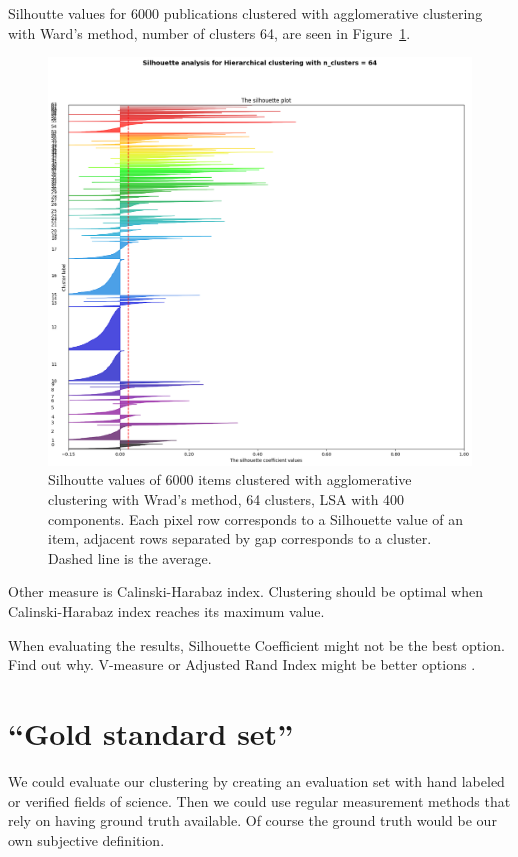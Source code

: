 Silhoutte values for 6000 publications clustered with 
agglomerative clustering with Ward's method, number of clusters 
64, are seen in Figure~\ref{fig:silh01}.
\begin{figure}[ht]
  \begin{center}    
\includegraphics[width=13cm]{images/6000-64-400-Hierarchical-silhouette-plot.png}
    \caption{Silhoutte values of 6000 items clustered with 
    agglomerative clustering with Wrad's method, 64 clusters, 
    LSA with 400 components. Each pixel row corresponds to a 
    Silhouette value of an item, adjacent rows separated by gap 
    corresponds to a cluster.
    Dashed line is the average.}
    \label{fig:silh01}
  \end{center}
\end{figure}

Other measure is Calinski-Harabaz index. Clustering should be 
optimal when Calinski-Harabaz index reaches its maximum value. 
\cite{}

When evaluating the results, Silhouette Coefficient might not be
the best option. Find out why. V-measure or Adjusted Rand Index
might be better options \cite{noauthor_clustering_nodate}.


\section{``Gold standard set''}
We could evaluate our clustering by creating an evaluation set with
hand labeled or verified fields of science. Then we could use
regular measurement methods that rely on having ground truth 
available. Of course the ground truth would be our own subjective 
definition. 


